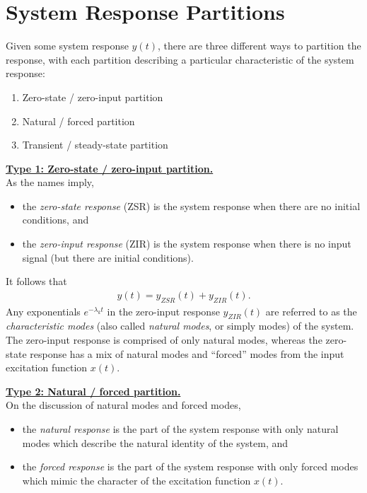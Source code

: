 \documentclass{report}
\begin{document}
\section{System Response Partitions}
Given some system response $y(t)$, there are three different ways to partition the response, with each partition describing a particular 
characteristic of the system response:
\begin{enumerate}
    \item Zero-state / zero-input partition
    \item Natural / forced partition
    \item Transient / steady-state partition
\end{enumerate}
\begin{tcolorbox}[width=\textwidth,colback={white}, sharp corners]
    \textbf{\underline{Type 1: Zero-state / zero-input partition.}} \\[0.25cm]
    As the names imply,
    \begin{itemize}
        \item the \emph{zero-state response} (ZSR) is the system response when there are no initial conditions, and
        \item the \emph{zero-input response} (ZIR) is the system response when there is no input signal (but there are initial conditions).
    \end{itemize}
\end{tcolorbox}
It follows that 
\begin{align}
    y(t) = y_{ZSR}(t) + y_{ZIR}(t).
\end{align}
Any exponentials $e^{-\lambda_k t}$ in the zero-input response $y_{ZIR}(t)$ are referred to as the \emph{characteristic modes} (also called \emph{natural modes}, or simply modes) 
of the system. The zero-input response is comprised of only natural modes, whereas the zero-state response has a mix of natural modes and ``forced'' modes from the input excitation function $x(t)$.
\begin{tcolorbox}[width=\textwidth,colback={white}, sharp corners]
    \textbf{\underline{Type 2: Natural / forced partition.}} \\[0.25cm]
    On the discussion of natural modes and forced modes,
    \begin{itemize}
        \item the \emph{natural response} is the part of the system response with only natural modes which describe the natural identity of the system, and
        \item the \emph{forced response} is the part of the system response with only forced modes which mimic the character of the excitation function $x(t)$.
    \end{itemize}
\end{tcolorbox}
\end{document}
